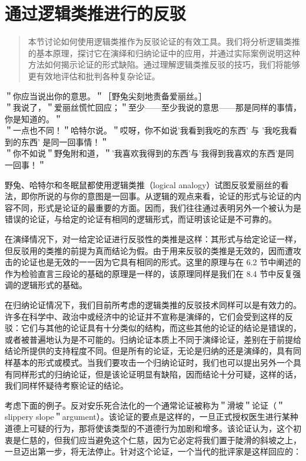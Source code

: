 \section{通过逻辑类推进行的反驳}

\begin{quotation}
本节讨论如何使用逻辑类推作为反驳论证的有效工具。我们将分析逻辑类推的基本原理，探讨它在演绎和归纳论证中的应用，并通过实际案例说明这种方法如何揭示论证的形式缺陷。通过理解逻辑类推反驳的技巧，我们将能够更有效地评估和批判各种复杂论证。
\end{quotation}

＂你应当说出你的意思。＂［野兔尖刻地责备爱丽丝。］\\
＂我说了，＂爱丽丝慌忙回应；＂至少——至少我说的意思——那是同样的事情，你是知道的。＂\\
＂一点也不同！＂哈特尔说。＂哎呀，你不如说'我看到我吃的东西' 与 '我吃我看到的东西' 是同一回事情！＂\\
＂你不如说＂野兔附和道，＂'我喜欢我得到的东西'与'我得到我喜欢的东西'是同一回事！＂

野兔、哈特尔和冬眠鼠都使用逻辑类推（logical analogy）试图反驳爱丽丝的看法，即你所说的与你的意图是一回事。从逻辑的观点来看，论证的形式与论证的内容不同，形式是论证的最重要的方面。因而，我们往往通过表明另外一个被认为是错误的论证，与给定的论证有相同的逻辑形式，而证明该论证是不可靠的。

在演绎情况下，对一给定论证进行反驳性的类推是这样：其形式与给定论证一样，但反驳用的类推的前提为真而结论为假。由于用来反驳的类推是无效的，因而遭攻击的论证也是无效的一一因为它具有相同的形式。这里的原理与在 6.2 节中阐述的作为检验直言三段论的基础的原理是一样的，该原理同样是我们在 8.4 节中反复强调的逻辑形式的基础。

在归纳论证情况下，我们目前所考虑的逻辑类推的反驳技术同样可以是有效力的。许多在科学中、政治中或经济中的论证并不宣称是演绎的，它们会受到这样的反驳：它们与其他的论证具有十分类似的结构，而这些其他的论证的结论是错误的，或者被普遍地认为是不可能的。归纳论证本质上不同于演绎论证，差别在于前提给结论所提供的支持程度不同。但是所有的论证，无论是归纳的还是演绎的，具有同样基本的形式或模式。当我们要攻击一个归纳论证时，我们也可以提出另外一个具有同样形式的归纳论证，但是该论证明显有缺陷，因而结论十分可疑，这样的话，我们同样怀疑待考察论证的结论。

考虑下面的例子。反对安乐死合法化的一个通常论证被称为＂滑坡＂论证（＂slippery slope＂argument）。该论证的要点是这样的，一旦正式授权医生进行某种道德上可疑的行为，那将使该类型的不道德行为加剧和增多。该论证认为，这个初衷是仁慈的，但我们应当避免这个仁慈，因为它必定将我们置于陡滑的斜坡之上，一旦迈出第一步，将无法停止。针对这个论证，一个当代的批评家是这样回应的：

